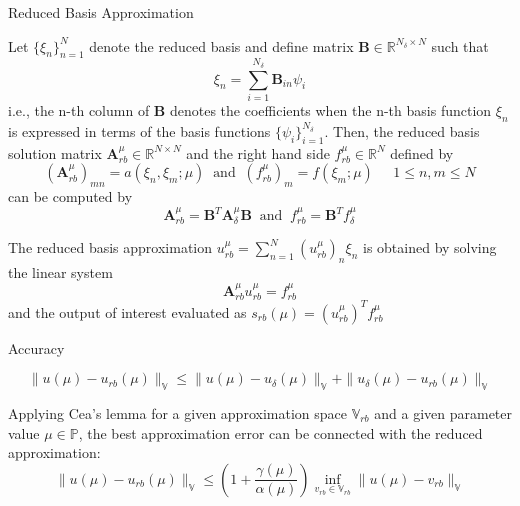 \documentclass[9pt]{beamer}
\begin{document}
\begin{frame}{Reduced Basis Approximation}
    \begin{block}{}
        Let $\{\xi_n\}_{n=1}^{N}$ denote the reduced basis and define matrix $\mathbf{B} \in \mathbb{R}^{N_{\delta} \times N}$ such that
        $$\xi_n = \sum_{i=1}^{N_{\delta}} \mathbf{B}_{in} \psi_i$$
        i.e., the n-th column of $\mathbf{B}$ denotes the coefficients when the n-th basis function $\xi_n$ is expressed in terms of the basis functions $\{\psi_i\}_{i=1}^{N_{\delta}}$. Then, the reduced basis solution matrix $\mathbf{A}_{rb}^{\mu} \in \mathbb{R}^{N \times N}$ and the right hand side $f_{rb}^{\mu} \in \mathbb{R}^{N}$ defined by 
        $$
        (\mathbf{A}_{rb}^{\mu})_{mn} = a(\xi_n, \xi_m; \mu) \mspace{10mu} \text{and} \mspace{10mu}(f_{rb}^{\mu})_m = f(\xi_m;\mu) \mspace{25mu} 1\leq n,m \leq N
        $$
        can be computed by 
        $$
        \mathbf{A}_{rb}^{\mu} = \mathbf{B}^T \mathbf{A}_{\delta}^{\mu}\mathbf{B} \mspace{10mu} \text{and} \mspace{10mu} f_{rb}^{\mu} = \mathbf{B}^T f_{\delta}^{\mu}
        $$
        
        The reduced basis approximation $u_{rb}^{\mu} = \sum_{n=1}^{N}(u_{rb}^{\mu})_n \xi_n$ is obtained by solving the linear system
        $$
        \mathbf{A}_{rb}^{\mu}u_{rb}^{\mu} = f_{rb}^{\mu}
        $$
        and the output of interest evaluated as $s_{rb}(\mu) = (u_{rb}^{\mu})^T f_{rb}^{\mu}$
    \end{block}
\end{frame}

\begin{frame}{Accuracy}
\begin{block}{}
$$
\|u(\mu) - u_{rb}(\mu)\|_{\mathbb{V}} \leq \|u(\mu) - u_{\delta}(\mu)\|_{\mathbb{V}} + \|u_{\delta}(\mu) - u_{rb}(\mu)\|_{\mathbb{V}}
$$
\end{block}

Applying Cea's lemma for a given approximation space $\mathbb{V}_{rb}$ and a given parameter value $\mu \in \mathbb{P}$, the best approximation error can be connected with the reduced approximation:
$$
\|u(\mu) - u_{rb}(\mu)\|_{\mathbb{V}} \leq \left( 1 + \frac{\gamma(\mu)}{\alpha(\mu)}\right) \inf_{v_{rb} \in \mathbb{V}_{rb}} \|u(\mu) - v_{rb}\|_{\mathbb{V}}
$$
    
\end{frame}
\end{document}

